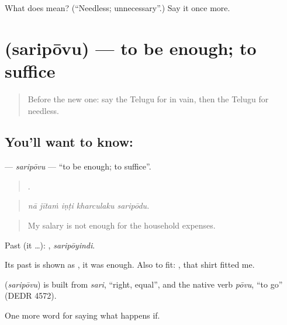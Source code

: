 \begin{tcolorbox}[breakable,colback=teal!4,colframe=teal!35!black,title={Before you move on}]
What does  mean? (\textquotedblleft{}Needless; unnecessary\textquotedblright{}.) Say it once more.
\end{tcolorbox}
\section[\texorpdfstring{\te{సరిపోవు} (saripōvu)}{సరిపోవు (saripōvu)}]{ (saripōvu) — to be enough; to suffice}

\label{lesson:TE-C423-saripovu}



\begin{quote}
Before the new one: say the Telugu for in vain, then the Telugu for needless.
\end{quote}

\subsection*{You'll want to know: }
\textbf{} — \emph{saripōvu} — \textquotedblleft{}to be enough; to suffice\textquotedblright{}.

\begin{quote}
    .
\end{quote}

\begin{quote}
\emph{nā jītaṁ iṇṭi kharculaku saripōdu.}
\end{quote}

\begin{quote}
My salary is not enough for the household expenses.
\end{quote}

Past (it …): , \emph{saripōyindi}.

Its past is shown as , it was enough. Also to fit:    , that shirt fitted me.

\begin{cousinweb}
\textbf{} (\emph{saripōvu}) is built from \emph{sari}, \textquotedblleft{}right, equal\textquotedblright{}, and the native verb \emph{pōvu}, \textquotedblleft{}to go\textquotedblright{} (DEDR 4572).
\end{cousinweb}

\begin{grammarlens}[title={What you've built}]
One more word for saying what happens if.
\end{grammarlens}

